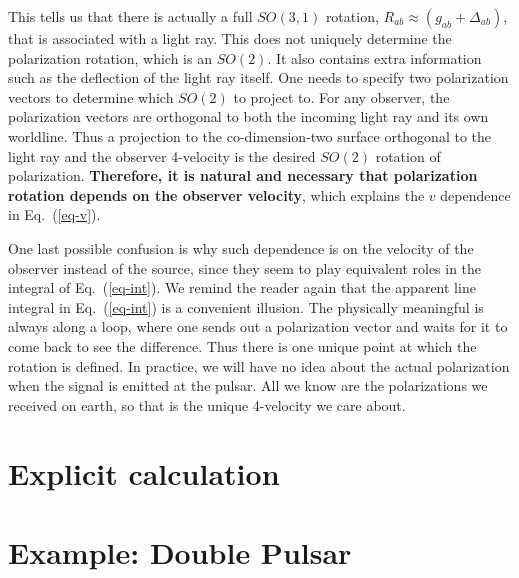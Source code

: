 \documentclass[aps,showpacs,onecolumn,floats,prd,superscriptaddress,nofootinbib]{revtex4}
\begin{document}
This tells us that there is actually a full $SO(3,1)$ rotation, $R_{ab}\approx\left(g_{ab} + \Delta_{ab}\right)$, that is associated with a light ray. This does not uniquely determine the polarization rotation, which is an $SO(2)$. It also contains extra information such as the deflection of the light ray itself. One needs to specify two polarization vectors to determine which $SO(2)$ to project to. For any observer, the polarization vectors are orthogonal to both the incoming light ray and its own worldline. Thus a projection to the co-dimension-two surface orthogonal to the light ray and the observer 4-velocity is the desired $SO(2)$ rotation of polarization. {\bf Therefore, it is natural and necessary that polarization rotation depends on the observer velocity}, which explains the $v$ dependence in Eq.~(\ref{eq-v}).

One last possible confusion is why such dependence is on the velocity of the observer instead of the source, since they seem to play equivalent roles in the integral of Eq.~(\ref{eq-int}). We remind the reader again that the apparent line integral in Eq.~(\ref{eq-int}) is a convenient illusion. The physically meaningful is always along a loop, where one sends out a polarization vector and waits for it to come back to see the difference. Thus there is one unique point at which the rotation is defined. In practice, we will have no idea about the actual polarization when the signal is emitted at the pulsar. All we know are the polarizations we received on earth, so that is the unique 4-velocity we care about.

\section{Explicit calculation}



\section{Example: Double Pulsar}
\label{sec-prediction}


\end{document}
